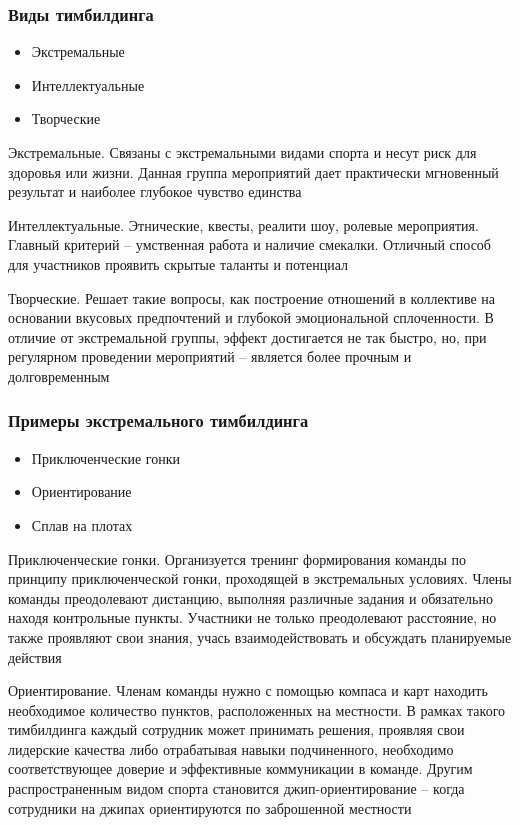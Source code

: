 \documentclass{../industrial-development}
\begin{document}
\begin{frame} \frametitle{Виды тимбилдинга}
\begin{itemize}
\item Экстремальные
\item Интеллектуальные
\item Творческие
\end{itemize}
\end{frame}
\lecturenotes
Экстремальные. Связаны с экстремальными видами спорта и несут риск для здоровья или жизни. Данная группа мероприятий дает практически мгновенный результат и наиболее глубокое чувство единства

Интеллектуальные. Этнические, квесты, реалити шоу, ролевые мероприятия. Главный критерий – умственная работа и наличие смекалки. Отличный способ для участников проявить скрытые таланты и потенциал

Творческие. Решает такие вопросы, как построение отношений в коллективе на основании вкусовых предпочтений и глубокой эмоциональной сплоченности. В отличие от экстремальной группы, эффект достигается не так быстро, но, при регулярном проведении мероприятий – является более прочным и долговременным

\begin{frame} \frametitle{Примеры экстремального тимбилдинга}
\begin{itemize}
\item Приключенческие гонки
\item Ориентирование
\item Сплав на плотах
\end{itemize}
\end{frame}
\lecturenotes
Приключенческие гонки. Организуется тренинг формирования команды по принципу приключенческой гонки, проходящей в экстремальных условиях. Члены команды преодолевают дистанцию, выполняя различные задания и обязательно находя контрольные пункты. Участники не только преодолевают расстояние, но также проявляют свои знания, учась взаимодействовать и обсуждать планируемые действия

Ориентирование. Членам команды нужно с помощью компаса и карт находить необходимое количество пунктов, расположенных на местности. В рамках такого тимбилдинга каждый сотрудник может принимать решения, проявляя свои лидерские качества либо отрабатывая навыки подчиненного, необходимо соответствующее доверие и эффективные коммуникации в команде. Другим распространенным видом спорта становится джип-ориентирование – когда сотрудники на джипах ориентируются по заброшенной местности
\end{document}
